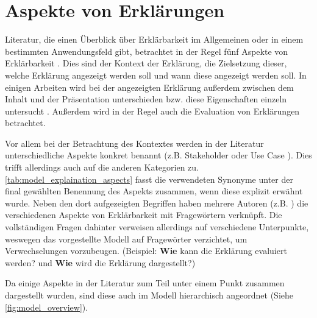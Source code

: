 \section{Aspekte von Erklärungen}
\label{sec:model_explanation_aspects}

Literatur, die einen Überblick über Erklärbarkeit im Allgemeinen oder in einem bestimmten Anwendungsfeld gibt, betrachtet in der Regel fünf Aspekte von Erklärbarkeit \cite{rosenfeld_explainability_2019, nunes_systematic_2017,chazette_knowledge_nodate}. Dies sind der Kontext der Erklärung, die Zielsetzung dieser, welche Erklärung angezeigt werden soll und wann diese angezeigt werden soll. In einigen Arbeiten wird bei der angezeigten Erklärung außerdem zwischen dem Inhalt und der Präsentation unterschieden bzw. diese Eigenschaften einzeln untersucht \cite{nunes_systematic_2017,abdulrahman_belief-based_2019}. Außerdem wird in der Regel auch die Evaluation von Erklärungen betrachtet.

Vor allem bei der Betrachtung des Kontextes werden in der Literatur unterschiedliche Aspekte konkret benannt (z.B. \glqq Stakeholder\grqq{} \cite{rosenfeld_explainability_2019} oder \glqq Use Case\grqq{} \cite{waa_evaluating_2021}). Dies trifft allerdings auch auf die anderen Kategorien zu. \autoref{tab:model_explaination_aspects} fasst die verwendeten Synonyme unter der final gewählten Benennung des Aspekts zusammen, wenn diese explizit erwähnt wurde. Neben den dort aufgezeigten Begriffen haben mehrere Autoren (z.B. \cite{rosenfeld_explainability_2019, chazette2020explainability}) die verschiedenen Aspekte von Erklärbarkeit mit Fragewörtern verknüpft. Die vollständigen Fragen dahinter verweisen allerdings auf verschiedene Unterpunkte, weswegen das vorgestellte Modell auf Fragewörter verzichtet, um Verwechselungen vorzubeugen. (Beispiel: \glqq \textbf{Wie} kann die Erklärung evaluiert werden?\grqq \cite{rosenfeld_explainability_2019} und \glqq \textbf{Wie} wird die Erklärung dargestellt?\grqq \cite{})

Da einige Aspekte in der Literatur zum Teil unter einem Punkt zusammen dargestellt wurden, sind diese auch im Modell hierarchisch angeordnet (Siehe \autoref{fig:model_overview}).

\newpage


